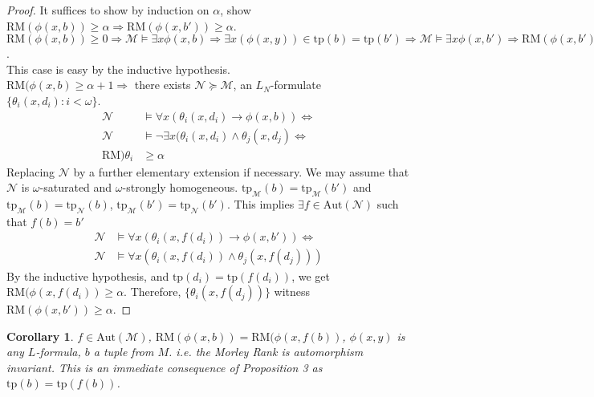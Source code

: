 \documentclass[letterpaper, 12pt]{article}
\newcommand{\cM}{\mathcal{M}}
\newcommand{\cN}{\mathcal{N}}
\newcommand{\Aut}{\mbox{Aut}}
\newcommand{\tp}{\mbox{tp}}
\newcommand{\RM}{\mbox{RM}}
\theoremstyle{stdthm}
\newtheorem{cor}[thm]{Corollary}
\theoremstyle{stddef}
\theoremstyle{stdnonum}
\theoremstyle{stdqands}
\theoremstyle{stdbold}
\begin{document}
\begin{proof}
It suffices to show by induction on $\alpha$, show $\RM(\phi(x,b)) \geq \alpha \Rightarrow \RM(\phi(x,b')) \geq \alpha$. \\

 $\RM(\phi(x,b)) \geq 0 \Rightarrow \cM \models \exists x \phi(x,b) \Rightarrow \exists x(\phi(x,y)) \in \tp(b) = \tp(b') \Rightarrow \cM \models \exists x \phi(x,b') \Rightarrow \RM(\phi(x,b')) \geq 0$.  \\

 This case is easy by the inductive hypothesis. \\

 $\RM(\phi(x,b) \geq \alpha + 1 \Rightarrow$ there exists $\cN \succeq \cM$, an $L_N$-formulate $\{\theta_i(x,d_i): i < \omega \}$.  
\begin{align*}
\cN &\models \forall x (\theta_i(x,d_i) \to \phi(x,b)) \iff \\
\cN &\models \neg \exists x (\theta_i(x,d_i)\wedge \theta_j(x,d_j) \iff\\
\RM)\theta_i &\geq \alpha 
\end{align*}
Replacing $\cN$ by a further elementary extension if necessary. We may assume that $\cN$ is $\omega$-saturated and $\omega$-strongly homogeneous. $\tp_{\cM}(b) = \tp_{\cM}(b')$ and $\tp_\cM(b) = \tp_\cN(b)$, $\tp_\cM(b') = \tp_\cN(b')$. This implies $\exists f \in \Aut(\cN)$ such that $f(b) = b'$ 
\begin{align*}
\cN & \models \forall x (\theta_i(x,f(d_i)) \to \phi(x,b')) \iff\\
\cN & \models \forall x (\theta_i(x,f(d_i)) \wedge \theta_j(x,f(d_j)))
\end{align*}
By the inductive hypothesis, and $\tp(d_i) = \tp(f(d_i))$, we get $\RM(\phi(x,f(d_i)) \geq \alpha$. Therefore, $\{\theta_i(x,f(d_j))\}$ witness $\RM(\phi(x,b')) \geq \alpha$. 

\end{proof}

\begin{cor}
$f \in \Aut(\cM)$, $\RM(\phi(x,b)) = \RM(\phi(x,f(b))$, $\phi(x,y)$ is any $L$-formula, $b$ a tuple from $M$. i.e. the Morley Rank is automorphism invariant. This is an immediate consequence of Proposition 3 as $\tp(b) = \tp(f(b))$. 
\end{cor}
\end{document}
